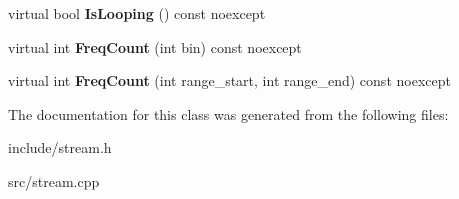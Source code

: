 \begin{DoxyCompactItemize}
virtual bool {\bfseries Is\+Looping} () const noexcept
\item 
\mbox{\label{class_blade_1_1_audio_stream_a0565e45755640f3bc979ba59d4dc49a9}} 
virtual int {\bfseries Freq\+Count} (int bin) const noexcept
\item 
\mbox{\label{class_blade_1_1_audio_stream_a592ea982ba9c2b0563508ba2517df824}} 
virtual int {\bfseries Freq\+Count} (int range\+\_\+start, int range\+\_\+end) const noexcept
\end{DoxyCompactItemize}


The documentation for this class was generated from the following files\+:\begin{DoxyCompactItemize}
\item 
include/stream.\+h\item 
src/stream.\+cpp\end{DoxyCompactItemize}
